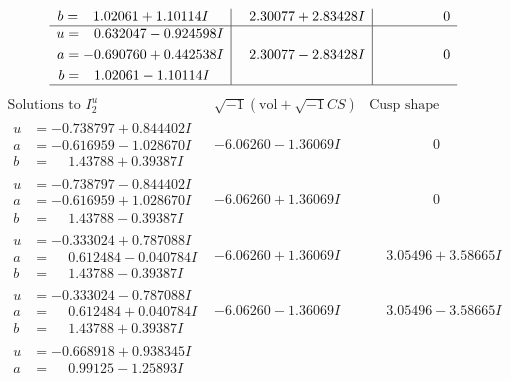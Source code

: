 \documentclass[1p]{elsarticle_modified}
\theoremstyle{definition}
\newcommand{\I}{\sqrt{-1}}
\begin{document}
$$\begin{array}{c|c|c}
\begin{aligned}
b &= \phantom{-}1.02061 + 1.10114 I\end{aligned}
 & \phantom{-}2.30077 + 2.83428 I & \phantom{-0.000000 } 0 \\ \hline\begin{aligned}
u &= \phantom{-}0.632047 - 0.924598 I \\
a &= -0.690760 + 0.442538 I \\
b &= \phantom{-}1.02061 - 1.10114 I\end{aligned}
 & \phantom{-}2.30077 - 2.83428 I & \phantom{-0.000000 } 0\\
 \hline 
 \end{array}$$\newpage$$\begin{array}{c|c|c}  
\text{Solutions to }I^u_{2}& \I (\text{vol} + \sqrt{-1}CS) & \text{Cusp shape}\\
 \hline 
\begin{aligned}
u &= -0.738797 + 0.844402 I \\
a &= -0.616959 - 1.028670 I \\
b &= \phantom{-}1.43788 + 0.39387 I\end{aligned}
 & -6.06260 - 1.36069 I & \phantom{-0.000000 } 0 \\ \hline\begin{aligned}
u &= -0.738797 - 0.844402 I \\
a &= -0.616959 + 1.028670 I \\
b &= \phantom{-}1.43788 - 0.39387 I\end{aligned}
 & -6.06260 + 1.36069 I & \phantom{-0.000000 } 0 \\ \hline\begin{aligned}
u &= -0.333024 + 0.787088 I \\
a &= \phantom{-}0.612484 - 0.040784 I \\
b &= \phantom{-}1.43788 - 0.39387 I\end{aligned}
 & -6.06260 + 1.36069 I & \phantom{-}3.05496 + 3.58665 I \\ \hline\begin{aligned}
u &= -0.333024 - 0.787088 I \\
a &= \phantom{-}0.612484 + 0.040784 I \\
b &= \phantom{-}1.43788 + 0.39387 I\end{aligned}
 & -6.06260 - 1.36069 I & \phantom{-}3.05496 - 3.58665 I \\ \hline\begin{aligned}
u &= -0.668918 + 0.938345 I \\
a &= \phantom{-}0.99125 - 1.25893 I \\

\end{aligned}
\end{array}$$
\end{document}
